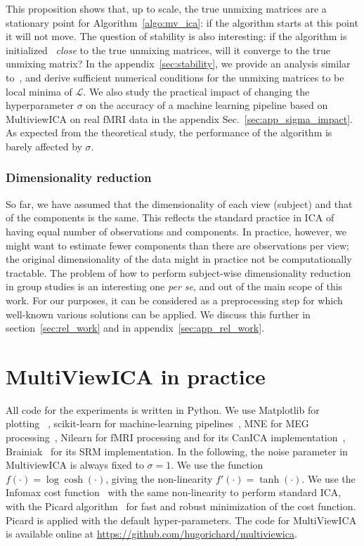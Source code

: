 \documentclass{report}
\begin{document}
{This proposition shows that, up to scale, the true unmixing matrices are a stationary point for Algorithm~\ref{algo:mv_ica}: if the algorithm starts at this point it will not move.
%
The question of stability is also interesting: if the algorithm is initialized ~\emph{close} to the true unmixing matrices, will it converge to the true unmixing matrix?
%
In the appendix~\ref{sec:stability}, we provide an analysis similar to~\cite{cardoso1998blind}, and derive sufficient numerical conditions for the unmixing matrices to be local minima of $\mathcal{L}$.
%
We also study the practical impact of changing the hyperparameter $\sigma$ on the accuracy of a machine learning pipeline based on MultiviewICA on real fMRI data in the appendix Sec.~\ref{sec:app_sigma_impact}.
%
As expected from the theoretical study, the performance of the algorithm is barely affected by $\sigma$.
\subsection{Dimensionality reduction}
%
So far, we have assumed that the dimensionality of each view (subject) and that of the components is the same. This reflects the standard practice in ICA of having equal number of observations and components. 
%
In practice, however, we might want to estimate fewer components than there are observations per view; the original dimensionality of the data %
might in practice not be computationally tractable.
%
The problem of how to perform subject-wise dimensionality reduction in group studies 
is an interesting one \emph{per se}, and out of the main scope of this work. For our purposes, it can be considered as a preprocessing step for which well-known various solutions can be applied. %
We discuss this further in section~\ref{sec:rel_work} and in appendix~\ref{sec:app_rel_work}.
%
%
%
%
%
\chapter{MultiViewICA in practice}
\label{sec:expts}
All code for the experiments is written in Python.
%
We use Matplotlib for plotting~\cite{hunter2007matplotlib} , scikit-learn for
machine-learning pipelines~\cite{pedregosa2011scikit}, MNE for MEG
processing~\cite{gramfort2013meg}, Nilearn for fMRI processing and for its CanICA implementation~\cite{abraham2014machine}, Brainiak~\cite{kumar2020brainiak} for its SRM implementation. 
%
In the following, the noise parameter in MultiviewICA is always fixed to $\sigma =1$.
%
We use the function $f(\cdot)= \log\cosh(\cdot)$, giving the non-linearity $f'(\cdot) = \tanh(\cdot)$.
%
We use the Infomax cost function~\cite{bell1995information} with the same non-linearity to perform standard ICA, with the Picard algorithm~\cite{ablin2018faster} for fast and robust minimization of the cost function. Picard is applied with the default hyper-parameters.
%
The code for MultiViewICA is available online at \url{https://github.com/hugorichard/multiviewica}.
%

}
\end{document}
